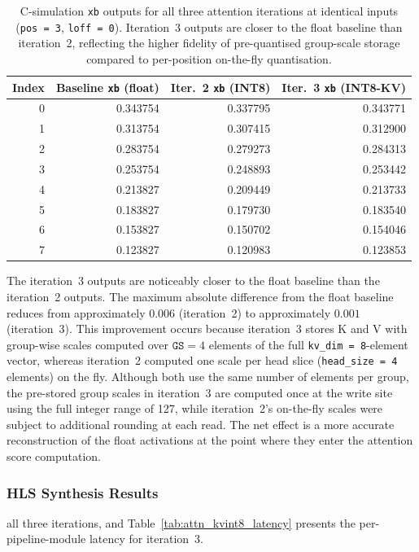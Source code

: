 \begin{table}[H]
  \centering
  \begin{tabular}{rrrr}
    \toprule
    Index & Baseline \texttt{xb} (float) & Iter.~2 \texttt{xb} (INT8) & Iter.~3 \texttt{xb} (INT8-KV) \\
    \midrule
    0 & 0.343754 & 0.337795 & 0.343771 \\
    1 & 0.313754 & 0.307415 & 0.312900 \\
    2 & 0.283754 & 0.279273 & 0.284313 \\
    3 & 0.253754 & 0.248893 & 0.253442 \\
    4 & 0.213827 & 0.209449 & 0.213733 \\
    5 & 0.183827 & 0.179730 & 0.183540 \\
    6 & 0.153827 & 0.150702 & 0.154046 \\
    7 & 0.123827 & 0.120983 & 0.123853 \\
    \bottomrule
  \end{tabular}
  \caption{C-simulation \texttt{xb} outputs for all three attention
           iterations at identical inputs (\texttt{pos\,=\,3},
           \texttt{loff\,=\,0}). Iteration~3 outputs are closer
           to the float baseline than iteration~2, reflecting
           the higher fidelity of pre-quantised group-scale storage
           compared to per-position on-the-fly quantisation.}
  \label{tab:attn_csim_all}
\end{table}

The iteration~3 outputs are noticeably closer to the float baseline
than the iteration~2 outputs. The maximum absolute difference from
the float baseline reduces from approximately $0.006$ (iteration~2) to
approximately $0.001$ (iteration~3). This improvement occurs because
iteration~3 stores K and V with group-wise scales computed over
$\texttt{GS} = 4$ elements of the full \texttt{kv\_dim\,=\,8}-element
vector, whereas iteration~2 computed one scale per head slice
(\texttt{head\_size\,=\,4} elements) on the fly. Although both use the
same number of elements per group, the pre-stored group scales in
iteration~3 are computed once at the write site using the full integer
range of 127, while iteration~2's on-the-fly scales were subject to
additional rounding at each read. The net effect is a more accurate
reconstruction of the float activations at the point where they
enter the attention score computation.

\subsubsection{HLS Synthesis Results}
\label{subsec:attn_kvint8_csyn}
all three iterations, and Table~\ref{tab:attn_kvint8_latency} presents
the per-pipeline-module latency for iteration~3.

